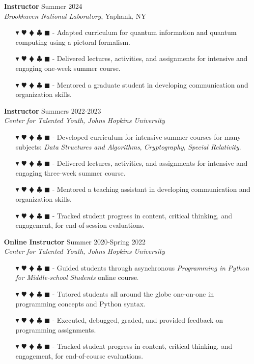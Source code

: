 \documentclass[overlapped, 10pt]{res} %
\newcommand{\physics}{$\blacktriangledown$}
\newcommand{\biochem}{$\varheartsuit$}
\newcommand{\shannon}{$\vardiamondsuit$}
\newcommand{\classic}{$\clubsuit$}
\newcommand{\quantum}{$\blacksquare$}
\newcommand{\physicscolor}{\color{YellowOrange}}
\newcommand{\biochemcolor}{\color{Emerald}}
\newcommand{\shannoncolor}{\color{Goldenrod}}
\newcommand{\classiccolor}{\color{Cyan}}
\newcommand{\quantumcolor}{\color{RedOrange}}
\newcommand{\tag}[1]{
    {\IfSubStr{#1}{\physics}{\physicscolor}{\color{White}}\physics}
    {\IfSubStr{#1}{\biochem}{\biochemcolor}{\color{White}}\biochem}
    {\IfSubStr{#1}{\shannon}{\shannoncolor}{\color{White}}\shannon}
    {\IfSubStr{#1}{\classic}{\classiccolor}{\color{White}}\classic}
    {\IfSubStr{#1}{\quantum}{\quantumcolor}{\color{White}}\quantum}
}
\begin{document}
\begin{resume}
\textbf{Instructor} \hfill Summer 2024 \\
\textit{Brookhaven National Laboratory}, Yaphank, NY
\begin{itemize} \itemsep -2pt %
\item[\tag{\shannon\quantum}-] Adapted curriculum for quantum information and quantum computing using a pictoral formalism.
\item[\tag{\shannon\quantum}-] Delivered lectures, activities, and assignments for intensive and engaging one-week summer course.
\item[\tag{}-] Mentored a graduate student in developing communication and organization skills.
\end{itemize}

\textbf{Instructor} \hfill Summers 2022-2023 \\
\textit{Center for Talented Youth, Johns Hopkins University}
\begin{itemize} \itemsep -2pt %
\item[\tag{\physics\shannon\classic}-] Developed curriculum for intensive summer courses for many subjects: \textit{Data Structures and Algorithms}, \textit{Cryptography}, \textit{Special Relativity}.
\item[\tag{\classic}-] Delivered lectures, activities, and assignments for intensive and engaging three-week summer course.
\item[\tag{}-] Mentored a teaching assistant in developing communication and organization skills.
\item[\tag{}-] Tracked student progress in content, critical thinking, and engagement, for end-of-session evaluations.
\end{itemize}

\textbf{Online Instructor} \hfill Summer 2020-Spring 2022 \\
\textit{Center for Talented Youth, Johns Hopkins University}
\begin{itemize} \itemsep -2pt %
\item[\tag{\classic}-] Guided students through asynchronous \textit{Programming in Python for Middle-school Students} online course.
\item[\tag{\classic}-] Tutored students all around the globe one-on-one in programming concepts and Python syntax.
\item[\tag{\classic}-] Executed, debugged, graded, and provided feedback on programming assignments.
\item[\tag{}-] Tracked student progress in content, critical thinking, and engagement, for end-of-course evaluations.
\end{itemize}


\end{resume}
\end{document}
